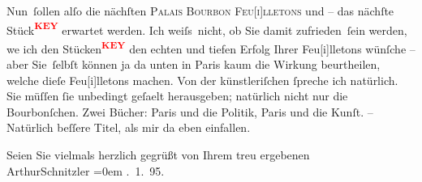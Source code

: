 \pstart
           Nun ſollen alſo die nächſten \textsc{Palais Bourbon
                     Feu{[}i{]}lletons} und – das nächſte Stück\textcolor{red}{\textsuperscript{\textbf{KEY}}} erwartet
               werden. Ich weiſs nicht, ob Sie damit zufrieden ſein werden, we{\geminationn} ich den Stücken\textcolor{red}{\textsuperscript{\textbf{KEY}}} den echten und tiefen Erfolg Ihrer Feu{[}i{]}lletons
               wünſche – aber Sie ſelbſt können {\pb}ja da unten in Paris kaum die Wirkung beurtheilen, welche dieſe
                  Feu{[}i{]}lletons machen. Von der künstleriſchen{ }ſpreche ich
               natürlich. Sie müſſen{ }ſie unbedingt geſa{\geminationm}elt
               herausgeben; natürlich nicht nur die Bourbonſchen. Zwei Bücher: Paris und die Politik, Paris und die Kunſt. – Natürlich beſſere Titel, als mir da eben
               einfallen.\pend
           
\pstart
           Seien Sie vielmals herzlich gegrüßt von Ihrem treu ergebenen{\\[\baselineskip]}\spacefill\mbox{ArthurSchnitzler}\pend
           \leftskip=0em{}
. 1. 95.\pend
           \endnumbering{}
\begin{anhang}
\end{anhang}\newcommand{\dateiname}{L03919}\newcommand{\titel}{Arthur Schnitzler an Theodor Herzl, 14. 1. 1895}\newcommand{\editorInnen}{Herausgegeben von Jahnke, SelmaMüller, Martin Anton}
